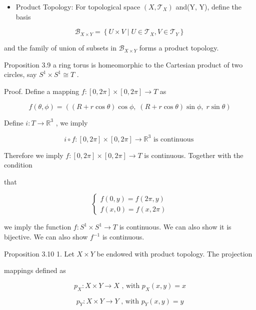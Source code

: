 \begin{itemize}
\item Product Topology: For topological space \(\left( {X,{\mathcal{T}}_{X}}\right)\) and(Y, Y), define the basis
\end{itemize}

\[
{\mathcal{B}}_{X \times  Y} = \left\{  {U \times  V \mid  U \in  {\mathcal{T}}_{X},V \in  {\mathcal{T}}_{Y}}\right\}
\]

and the family of union of subsets in \({\mathcal{B}}_{X \times  Y}\) forms a product topology.

Proposition 3.9 a ring torus is homeomorphic to the Cartesian product of two circles, say \({S}^{1} \times  {S}^{1} \cong  T\) .

Proof. Define a mapping \(f : \left\lbrack  {0,{2\pi }}\right\rbrack   \times  \left\lbrack  {0,{2\pi }}\right\rbrack   \rightarrow  T\) as

\[
f\left( {\theta ,\phi }\right)  = \left( {\left( {R + r\cos \theta }\right) \cos \phi ,\;\left( {R + r\cos \theta }\right) \sin \phi ,\;r\sin \theta }\right)
\]

Define \(i : T \rightarrow  {\mathbb{R}}^{3}\) , we imply

\[
i \circ  f : \left\lbrack  {0,{2\pi }}\right\rbrack   \times  \left\lbrack  {0,{2\pi }}\right\rbrack   \rightarrow  {\mathbb{R}}^{3}\text{ is continuous }
\]

Therefore we imply \(f : \left\lbrack  {0,{2\pi }}\right\rbrack   \times  \left\lbrack  {0,{2\pi }}\right\rbrack   \rightarrow  T\) is continuous. Together with the condition

that

\[
\left\{  \begin{array}{l} f\left( {0,y}\right)  = f\left( {{2\pi },y}\right) \\  f\left( {x,0}\right)  = f\left( {x,{2\pi }}\right)  \end{array}\right.
\]

we imply the function \(f : {S}^{1} \times  {S}^{1} \rightarrow  T\) is continuous. We can also show it is bijective. We can also show \({f}^{-1}\) is continuous.

Proposition 3.10 1. Let \(X \times  Y\) be endowed with product topology. The projection

mappings defined as

\[
{p}_{X} : X \times  Y \rightarrow  X\text{ , with }{p}_{X}\left( {x,y}\right)  = x
\]

\[
{p}_{Y} : X \times  Y \rightarrow  Y\text{ , with }{p}_{Y}\left( {x,y}\right)  = y
\]


